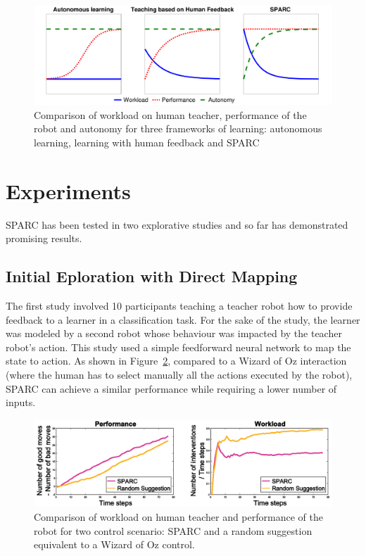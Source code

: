\documentclass[conference]{IEEEtran}
\begin{document}
\begin{figure}
    \centering
    \includegraphics[width=0.9\linewidth]{motivation.pdf}
    \caption{Comparison of workload on human teacher, performance of the robot
    and autonomy for three frameworks of learning: autonomous learning, learning
    with human feedback and SPARC}
    \label{fig:comparison}
\end{figure}

\section{Experiments}

SPARC has been tested in two explorative studies and so far has demonstrated
promising results.

\subsection{Initial Eploration with Direct Mapping}

The first study \cite{senft2015sparc} involved 10 participants teaching a
teacher robot how to provide feedback to a learner in a classification task. For
the sake of the study, the learner was modeled by a second robot whose behaviour
was impacted by the teacher robot's action. This study used a simple feedforward
neural network to map the state to action. As shown in Figure~\ref{fig:ICSR},
compared to a Wizard of Oz interaction (where the human has to select manually
all the actions executed by the robot), SPARC can achieve a similar performance
while requiring a lower number of inputs.

\begin{figure}
    \centering
    \includegraphics[width=0.9\linewidth]{ICSR.pdf}
    \caption{Comparison of workload on human teacher and performance of the robot
    for two control scenario: SPARC and a random suggestion equivalent to a
    Wizard of Oz control.}
    \label{fig:ICSR}
\end{figure}
\end{document}

